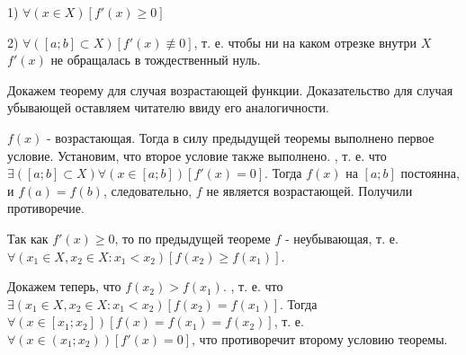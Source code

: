 1) $\forall(x \in X) [f'(x)\geq 0]$

2) $\forall([a;b] \subset X)[f'(x)\not\equiv 0]$, т. е. чтобы ни на каком отрезке внутри $X$ $f'(x)$ не обращалась в тождественный нуль.

\dokvo 

Докажем теорему для случая возрастающей функции. Доказательство для случая убывающей оставляем читателю ввиду его аналогичности.

\neobh

$f(x)$ - возрастающая. Тогда в силу предыдущей теоремы выполнено первое условие.
Установим, что второе условие также выполнено.
\pp, т. е. что $\exists([a;b] \subset X)\forall(x \in [a;b])[f'(x)=0]$.
Тогда $f(x)$ на $[a;b]$ постоянна, и $f(a)=f(b)$, следовательно, $f$ не является возрастающей. Получили противоречие.

\dost

Так как $f'(x) \geq 0$, то по предыдущей теореме $f$ - неубывающая, т. е.
$\forall(x_1\in X, x_2 \in X : x_1<x_2)[f(x_2) \geq f(x_1)]$.

Докажем теперь, что $f(x_2) > f(x_1)$.
\pp, т. е. что $\exists(x_1\in X, x_2 \in X : x_1<x_2)[f(x_2) = f(x_1)]$.
Тогда $\forall(x\in [x_1; x_2])[f(x)=f(x_1)=f(x_2)]$, т. е. $\forall(x\in(x_1;x_2))[f'(x)=0]$, что противоречит второму условию теоремы.

\dokno

